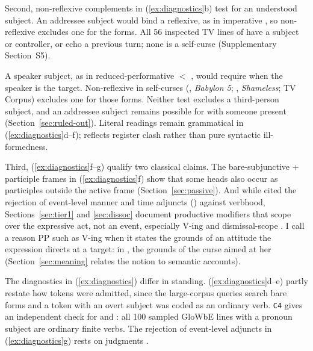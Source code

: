 \documentclass[12pt]{article}
\begin{document}
Second, non-reflexive complements in (\ref{ex:diagnostics}b) test for an understood subject. An addressee subject would bind a reflexive, as in imperative  \citep[3]{quang1971,pinker2007,portner2026}, so non-reflexive  excludes one for the  forms. All 56 inspected TV lines of  have a subject or controller, or echo a previous turn; none is a self-curse (Supplementary Section~S5).

A speaker subject, as in reduced-performative  $<$ , would require  when the speaker is the target. Non-reflexive  in self-curses (, \emph{Babylon 5}; , \emph{Shameless}; TV Corpus) excludes one for those forms. Neither test excludes a third-person subject, and an addressee subject remains possible for  with someone present (Section~\ref{sec:ruled-out}). Literal readings remain grammatical in (\ref{ex:diagnostics}d--f);  reflects register clash rather than pure syntactic ill-formedness.

Third, (\ref{ex:diagnostics}f--g) qualify two classical claims. The bare-subjunctive  + participle frames in (\ref{ex:diagnostics}f) show that some heads also occur as participles outside the active frame (Section~\ref{sec:passive}). And while \textcite[5--6]{quang1971} cited the rejection of event-level manner and time adjuncts () against verbhood, Sections~\ref{sec:tier1} and \ref{sec:dissoc} document productive modifiers that scope over the expressive act, not an event, especially  V-ing and dismissal-scope . I call a reason PP such as  V-ing  when it states the grounds of an attitude the expression directs at a target: in , the grounds of the curse aimed at her (Section~\ref{sec:meaning} relates the notion to semantic accounts).

The diagnostics in (\ref{ex:diagnostics}) differ in standing. (\ref{ex:diagnostics}d--e) partly restate how tokens were admitted, since the large-corpus queries search bare forms and a token with an overt subject was coded as an ordinary verb. \texttt{C4} gives an independent check for  and : all 100 sampled GloWbE lines with a pronoun subject are ordinary finite verbs. The rejection of event-level adjuncts in (\ref{ex:diagnostics}g) rests on judgments \citep[5--6]{quang1971}.
\end{document}
